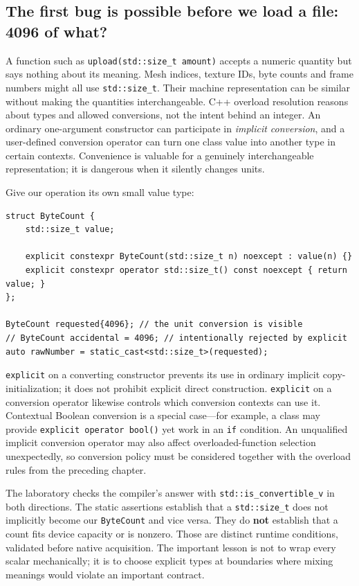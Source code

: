 \subsection{The first bug is possible before we load a file: 4096 of what?}\label{01-foundations-i-ch004-the-first-bug-is-possible-before-we-load-a-file-4096-of-what}

A function such as \texttt{upload(std::size\_t\ amount)} accepts a numeric quantity but says nothing about its meaning. Mesh indices, texture IDs, byte counts and frame numbers might all use \texttt{std::size\_t}. Their machine representation can be similar without making the quantities interchangeable. C++ overload resolution reasons about types and allowed conversions, not the intent behind an integer. An ordinary one-argument constructor can participate in \emph{implicit conversion}, and a user-defined conversion operator can turn one class value into another type in certain contexts. Convenience is valuable for a genuinely interchangeable representation; it is dangerous when it silently changes units.

Give our operation its own small value type:

\begin{verbatim}
struct ByteCount {
    std::size_t value;

    explicit constexpr ByteCount(std::size_t n) noexcept : value(n) {}
    explicit constexpr operator std::size_t() const noexcept { return value; }
};

ByteCount requested{4096}; // the unit conversion is visible
// ByteCount accidental = 4096; // intentionally rejected by explicit
auto rawNumber = static_cast<std::size_t>(requested);
\end{verbatim}

\texttt{explicit} on a converting constructor prevents its use in ordinary implicit copy-initialization; it does not prohibit explicit direct construction. \texttt{explicit} on a conversion operator likewise controls which conversion contexts can use it. Contextual Boolean conversion is a special case---for example, a class may provide \texttt{explicit\ operator\ bool()} yet work in an \texttt{if} condition. An unqualified implicit conversion operator may also affect overloaded-function selection unexpectedly, so conversion policy must be considered together with the overload rules from the preceding chapter.

The laboratory checks the compiler's answer with \texttt{std::is\_convertible\_v} in both directions. The static assertions establish that a \texttt{std::size\_t} does not implicitly become our \texttt{ByteCount} and vice versa. They do \textbf{not} establish that a count fits device capacity or is nonzero. Those are distinct runtime conditions, validated before native acquisition. The important lesson is not to wrap every scalar mechanically; it is to choose explicit types at boundaries where mixing meanings would violate an important contract.

